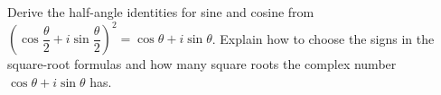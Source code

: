 Derive the half-angle identities for sine and cosine from
$\left(\cos\dfrac{\theta}{2}+i\sin\dfrac{\theta}{2}\right)^2=\cos\theta+i\sin\theta$.
Explain how to choose the signs in the square-root formulas and how many square roots the complex number $\cos\theta+i\sin\theta$ has.

